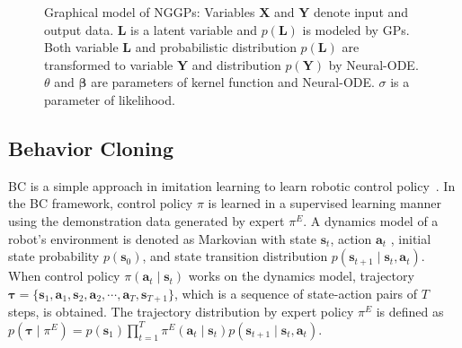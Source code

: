 \documentclass[sn-mathphys-num]{sn-jnl}
\begin{document}
\begin{figure}[t]
    \centering
    \caption{Graphical model of NGGPs: Variables $\mathbf{X}$ and $\mathbf Y$ denote input and output data. $\mathbf{L}$ is a latent variable and $p(\mathbf L)$ is modeled by GPs. Both variable $\mathbf L$ and probabilistic distribution $p(\mathbf L)$ are transformed to variable $\mathbf Y$ and distribution $p(\mathbf Y)$ by Neural-ODE. $\theta$ and $\boldsymbol{\beta}$ are parameters of kernel function and Neural-ODE. $\sigma$ is a parameter of likelihood.}
    \label{fig:graphical:NGGP}
\end{figure}
 
\subsection{Behavior Cloning}
BC is a simple approach in imitation learning to learn robotic control policy~\cite{osa2018}.
In the BC framework, control policy $\pi$ is learned in a supervised learning manner using the demonstration data generated by expert $\pi^E$.
A dynamics model of a robot's environment is denoted as Markovian with state $\mathbf s_t$, action $\mathbf a_t$ , initial state probability $p(\mathbf{s}_0)$, and state transition distribution $p(\mathbf s_{t+1}\mid \mathbf s_t, \mathbf a_t)$.
When control policy $\pi(\mathbf a_t \mid \mathbf s_t)$ works on the dynamics model, trajectory $\boldsymbol{\tau}=\{\mathbf{s}_{1},\mathbf{a}_{1},\mathbf{s}_{2},\mathbf{a}_{2}, \cdots, \mathbf{a}_{T},\mathbf{s}_{T+1}\}$, which is a sequence of state-action pairs of $T$ steps, is obtained.
The trajectory distribution by expert policy $\pi^E$ is defined as $p(\boldsymbol{\tau}\mid \pi^{E}) = p(\mathbf{s}_{1})\prod_{t=1}^T \pi^{E}(\mathbf{a}_{t}\mid\mathbf{s}_{t})p(\mathbf{s}_{t+1}\mid \mathbf{s}_{t}, \mathbf{a}_{t})$.
\end{document}
